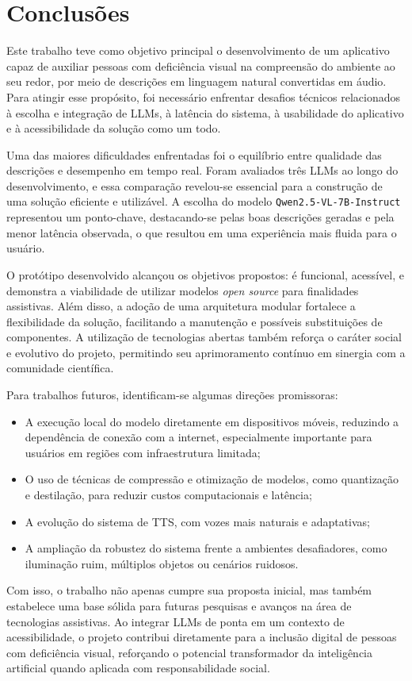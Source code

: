 \chapter{Conclusões} \label{cap:05}

Este trabalho teve como objetivo principal o desenvolvimento de um aplicativo capaz de auxiliar pessoas com deficiência visual na compreensão do ambiente ao seu redor, por meio de descrições em linguagem natural convertidas em áudio. Para atingir esse propósito, foi necessário enfrentar desafios técnicos relacionados à escolha e integração de LLMs, à latência do sistema, à usabilidade do aplicativo e à acessibilidade da solução como um todo.

Uma das maiores dificuldades enfrentadas foi o equilíbrio entre qualidade das descrições e desempenho em tempo real. Foram avaliados três LLMs ao longo do desenvolvimento, e essa comparação revelou-se essencial para a construção de uma solução eficiente e utilizável. A escolha do modelo \lstinline{Qwen2.5-VL-7B-Instruct} representou um ponto-chave, destacando-se pelas boas descrições geradas e pela menor latência observada, o que resultou em uma experiência mais fluida para o usuário.

O protótipo desenvolvido alcançou os objetivos propostos: é funcional, acessível, e demonstra a viabilidade de utilizar modelos \textit{open source} para finalidades assistivas. Além disso, a adoção de uma arquitetura modular fortalece a flexibilidade da solução, facilitando a manutenção e possíveis substituições de componentes. A utilização de tecnologias abertas também reforça o caráter social e evolutivo do projeto, permitindo seu aprimoramento contínuo em sinergia com a comunidade científica.

Para trabalhos futuros, identificam-se algumas direções promissoras:
\begin{itemize}
    \item A execução local do modelo diretamente em dispositivos móveis, reduzindo a dependência de conexão com a internet, especialmente importante para usuários em regiões com infraestrutura limitada;
    \item O uso de técnicas de compressão e otimização de modelos, como quantização e destilação, para reduzir custos computacionais e latência;
    \item A evolução do sistema de TTS, com vozes mais naturais e adaptativas;
    \item A ampliação da robustez do sistema frente a ambientes desafiadores, como iluminação ruim, múltiplos objetos ou cenários ruidosos.
\end{itemize}

Com isso, o trabalho não apenas cumpre sua proposta inicial, mas também estabelece uma base sólida para futuras pesquisas e avanços na área de tecnologias assistivas. Ao integrar LLMs de ponta em um contexto de acessibilidade, o projeto contribui diretamente para a inclusão digital de pessoas com deficiência visual, reforçando o potencial transformador da inteligência artificial quando aplicada com responsabilidade social.
